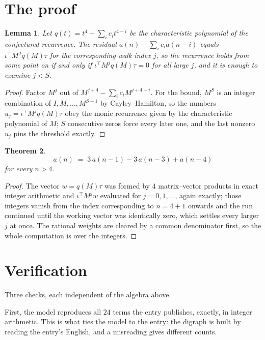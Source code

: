 \documentclass[11pt,a4paper]{article}
\theoremstyle{plain}
\newtheorem{theorem}{Theorem}
\newtheorem{lemma}[theorem]{Lemma}
\theoremstyle{definition}
\begin{document}
\section{The proof}

\begin{lemma}\label{lem:crit}
Let $q(t)=t^{4}-\sum_i c_it^{4-i}$ be the characteristic polynomial of the
conjectured recurrence. The residual $a(n)-\sum_ic_ia(n-i)$ equals
$\iota^{\!\top}M^{\,j}q(M)\tau$ for the corresponding walk index $j$, so the recurrence
holds from some point on if and only if $\iota^{\!\top}M^{j}q(M)\tau=0$ for all large $j$,
and it is enough to examine $j<S$.
\end{lemma}

\begin{proof}
Factor $M^{j}$ out of $M^{j+4}-\sum_ic_iM^{j+4-i}$. For the bound, $M^{S}$
is an integer combination of $I,M,\dots,M^{S-1}$ by Cayley--Hamilton, so the numbers
$u_j=\iota^{\!\top}M^{j}q(M)\tau$ obey the monic recurrence given by the characteristic
polynomial of $M$; $S$ consecutive zeros force every later one, and the last nonzero $u_j$
pins the threshold exactly.
\end{proof}

\begin{theorem}
\[
a(n)\;=\;3\,a(n-1) - 3\,a(n-3) + a(n-4)
\]
for every $n>4$.
\end{theorem}

\begin{proof}
The vector $w=q(M)\tau$ was formed by $4$ matrix--vector products in exact integer
arithmetic and $\iota^{\!\top}M^{j}w$ evaluated for $j=0,1,\dots$, again exactly; those
integers vanish from the index corresponding to $n=4+1$ onwards and the run continued
until the working vector was identically zero, which settles every larger $j$ at once. The
rational weights are cleared by a common denominator first, so the whole computation is over
the integers.
\end{proof}

\section{Verification}

Three checks, each independent of the algebra above.

First, the model reproduces all $24$ terms the entry publishes, exactly, in integer
arithmetic. This is what ties the model to the entry: the digraph is built by reading the
entry's English, and a misreading gives different counts.
\end{document}
